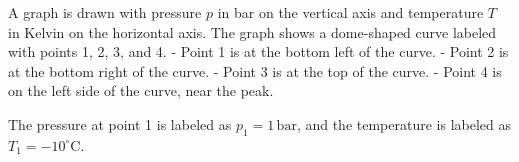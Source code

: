 A graph is drawn with pressure \( p \) in bar on the vertical axis and temperature \( T \) in Kelvin on the horizontal axis. The graph shows a dome-shaped curve labeled with points 1, 2, 3, and 4.  
- Point 1 is at the bottom left of the curve.  
- Point 2 is at the bottom right of the curve.  
- Point 3 is at the top of the curve.  
- Point 4 is on the left side of the curve, near the peak.  

The pressure at point 1 is labeled as \( p_1 = 1 \, \text{bar} \), and the temperature is labeled as \( T_1 = -10^\circ \text{C} \).